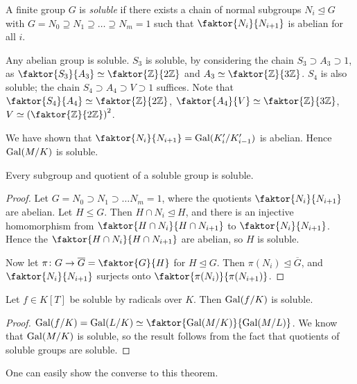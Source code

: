 \begin{definition}
	A finite group \( G \) is \emph{soluble} if there exists a chain of normal subgroups \( N_i \trianglelefteq G \) with \( G = N_0 \supseteq N_1 \supseteq \dots \supseteq N_m = \qty{1} \) such that \( \faktor{N_i}{N_{i+1}} \) is abelian for all \( i \).
\end{definition}
\begin{example}
	Any abelian group is soluble.
	\( S_3 \) is soluble, by considering the chain \( S_3 \supset A_3 \supset \qty{1} \), as \( \faktor{S_3}{A_3} \simeq \faktor{\mathbb Z}{2\mathbb Z} \) and \( A_3 \simeq \faktor{\mathbb Z}{3\mathbb Z} \).
	\( S_4 \) is also soluble; the chain \( S_4 \supset A_4 \supset V \supset \qty{1} \) suffices.
	Note that \( \faktor{S_4}{A_4} \simeq \faktor{\mathbb Z}{2\mathbb Z} \), \( \faktor{A_4}{V} \simeq \faktor{\mathbb Z}{3\mathbb Z} \), \( V \simeq \qty(\faktor{\mathbb Z}{2\mathbb Z})^2 \).
\end{example}
We have shown that \( \faktor{N_i}{N_{i+1}} = \Gal(K_i'/K_{i-1}') \) is abelian.
Hence \( \operatorname{Gal}(M/K) \) is soluble.
\begin{lemma}
	Every subgroup and quotient of a soluble group is soluble.
\end{lemma}
\begin{proof}
	Let \( G = N_0 \supset N_1 \supset \dots N_m = \qty{1} \), where the quotients \( \faktor{N_i}{N_{i+1}} \) are abelian.
	Let \( H \leq G \).
	Then \( H \cap N_i \trianglelefteq H \), and there is an injective homomorphism from \( \faktor{H \cap N_i}{H \cap N_{i+1}} \) to \( \faktor{N_i}{N_{i+1}} \).
	Hence the \( \faktor{H \cap N_i}{H \cap N_{i+1}} \) are abelian, so \( H \) is soluble.

	Now let \( \pi \colon G \to \overline G = \faktor{G}{H} \) for \( H \trianglelefteq G \).
	Then \( \pi(N_i) \trianglelefteq \overline G \), and \( \faktor{N_i}{N_{i+1}} \) surjects onto \( \faktor{\pi(N_i)}{\pi(N_{i+1})} \).
\end{proof}
\begin{theorem}
	Let \( f \in K[T] \) be soluble by radicals over \( K \).
	Then \( \operatorname{Gal}(f/K) \) is soluble.
\end{theorem}
\begin{proof}
	\( \Gal(f/K) = \Gal(L/K) \simeq \faktor{\Gal(M/K)}{\Gal(M/L)} \).
	We know that \( \operatorname{Gal}(M/K) \) is soluble, so the result follows from the fact that quotients of soluble groups are soluble.
\end{proof}
\begin{remark}
	One can easily show the converse to this theorem.
\end{remark}

